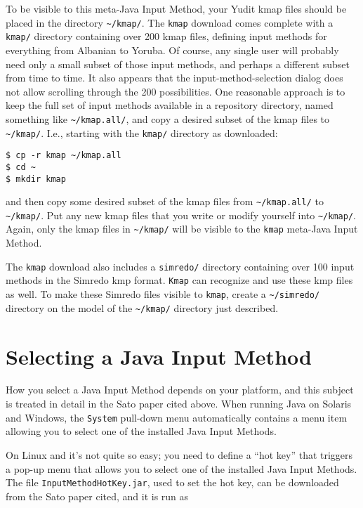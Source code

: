 To be visible to this meta-Java Input Method, your Yudit kmap files
should be placed in the directory \texttt{\~{}/kmap/}.  The
\texttt{kmap} download
comes complete with a \texttt{kmap/} directory containing over 200 kmap
files, defining input methods for everything from Albanian to Yoruba.  Of
course, any single user will probably need only a small subset of those
input methods, and perhaps a different subset from time to time.  It also
appears that the input-method-selection dialog does not allow scrolling
through the 200 possibilities.  One reasonable approach is to keep the
full set of input methods available in a repository directory, named
something like \texttt{\~{}/kmap.all/}, and copy a desired subset of the
kmap files  to \texttt{\~{}/kmap/}.  I.e., starting with the
\texttt{kmap/} directory as downloaded:

\begin{Verbatim}
$ cp -r kmap ~/kmap.all
$ cd ~
$ mkdir kmap
\end{Verbatim}

\noindent
and then copy some desired subset of the kmap files from
\texttt{\~{}/kmap.all/} to \texttt{\~{}/kmap/}.  Put any new kmap
files that you write or modify yourself into \texttt{\~{}/kmap/}.  
Again, only the kmap
files in \texttt{\~{}/kmap/} will be visible to the \texttt{kmap} meta-Java Input
Method.

The \texttt{kmap} download also includes a \texttt{simredo/} directory containing
over 100 input methods in the Simredo kmp format.  \texttt{Kmap} can recognize and
use these kmp files as well.  To make these Simredo files visible to
\texttt{kmap}, create a \texttt{\~{}/simredo/} directory on the model of the
\texttt{\~{}/kmap/} directory just described.

\section{Selecting a Java Input Method}

How you select a Java Input Method depends on your platform, and this
subject is treated in detail in the Sato paper cited above.  When running
Java on Solaris and Windows, the \texttt{System} pull-down menu
automatically contains a menu item allowing you to select one of the
installed Java Input Methods.

On Linux and  it's not quite so easy; 
you need to define a ``hot key'' that triggers a
pop-up menu that allows you to select one of the installed Java Input
Methods.  The  file \texttt{InputMethodHotKey.jar}, used
to set the hot key, can be
downloaded from the Sato paper cited, and it is run as

